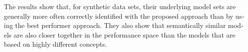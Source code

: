 \begin{otherlanguage}{english}
The results show that, for synthetic data sets, their underlying model sets are generally more often correctly identified with the proposed approach than by using the best performer approach. They also show that semantically similar models are also closer together in the performance space than the models that are based on highly different concepts.



\end{otherlanguage}
